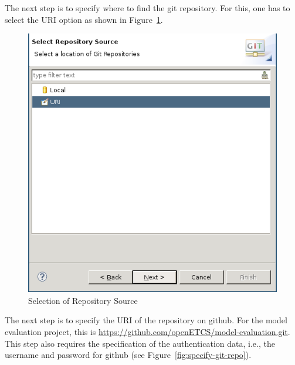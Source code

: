 \documentclass{template/openetcs_article}
\begin{document}
The next step is to specify where to find the git repository. For this, one has
to select the URI option as shown in Figure~\ref{fig:select-repo-source}.

\begin{figure}[H]
  \centering
  \includegraphics[width=\skalierung\textwidth]{project_import_step2}
  \caption{Selection of Repository Source}
  \label{fig:select-repo-source}
\end{figure}

The next step is to specify the URI of the repository on github. For the
model evaluation project, this is
\url{https://github.com/openETCS/model-evaluation.git}. This step also requires
the specification of the authentication data, i.e., the username and password
for github (see Figure~\ref{fig:specify-git-repo}).
\end{document}
